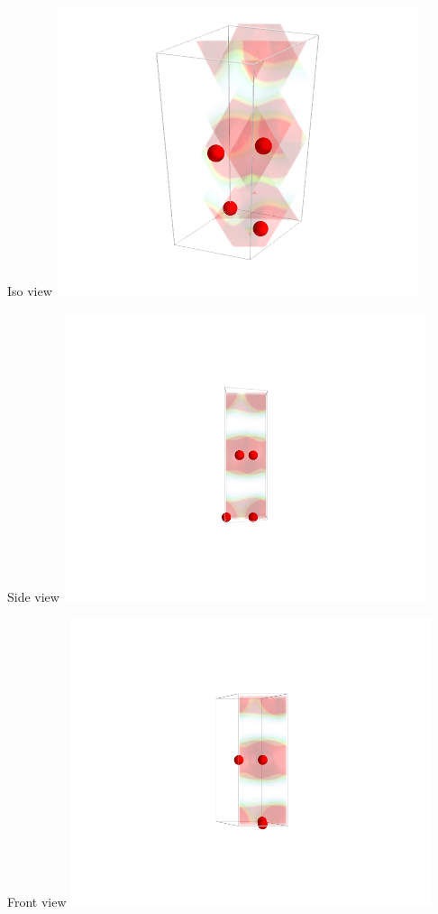 \documentclass[11pt]{article}
\begin{document}
\begin{itemize}
Iso view
\includegraphics[width=.9\linewidth]{./images/cGraph_iso.png}

Side view
\includegraphics[width=.9\linewidth]{./images/cGraph_side.png}

Front view
\includegraphics[width=.9\linewidth]{./images/cGraph_front.png}


\end{itemize}
\end{document}
